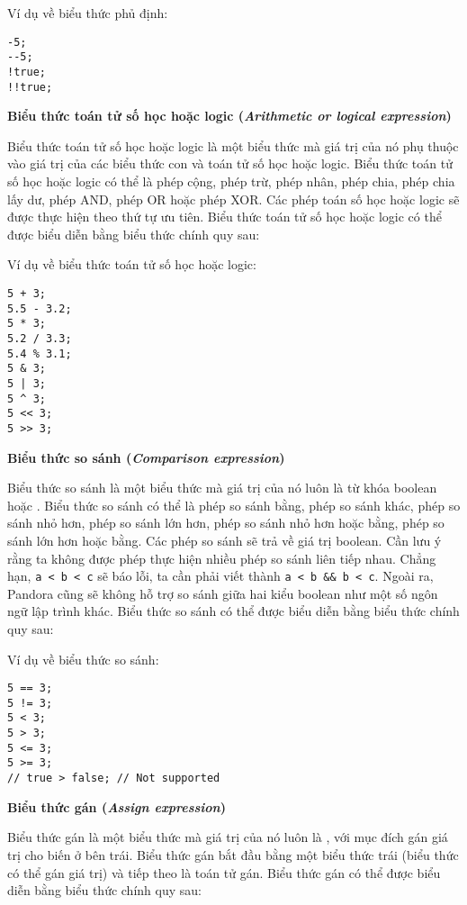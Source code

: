 \regexneexpr

\noindent Ví dụ về biểu thức phủ định:
\begin{lstlisting}[]
-5;
--5;
!true;
!!true;
\end{lstlisting}

\noindent\textbf{Biểu thức toán tử số học hoặc logic (\textit{Arithmetic or logical expression})}

    Biểu thức toán tử số học hoặc logic là một biểu thức mà giá trị của nó phụ thuộc vào giá trị của các biểu thức con và toán tử số học hoặc logic. Biểu thức toán tử số học hoặc logic có thể là phép cộng, phép trừ, phép nhân, phép chia, phép chia lấy dư, phép AND, phép OR hoặc phép XOR. Các phép toán số học hoặc logic sẽ được thực hiện theo thứ tự ưu tiên. Biểu thức toán tử số học hoặc logic có thể được biểu diễn bằng biểu thức chính quy sau:

\regexarithlogicexpr

\noindent Ví dụ về biểu thức toán tử số học hoặc logic:
\begin{lstlisting}[]
5 + 3;
5.5 - 3.2;
5 * 3;
5.2 / 3.3;
5.4 % 3.1;
5 & 3;
5 | 3;
5 ^ 3;
5 << 3;
5 >> 3;
\end{lstlisting}

\noindent\textbf{Biểu thức so sánh (\textit{Comparison expression})}

    Biểu thức so sánh là một biểu thức mà giá trị của nó luôn là từ khóa boolean  hoặc . Biểu thức so sánh có thể là phép so sánh bằng, phép so sánh khác, phép so sánh nhỏ hơn, phép so sánh lớn hơn, phép so sánh nhỏ hơn hoặc bằng, phép so sánh lớn hơn hoặc bằng. Các phép so sánh sẽ trả về giá trị boolean. Cần lưu ý rằng ta không được phép thực hiện nhiều phép so sánh liên tiếp nhau. Chẳng hạn, \texttt{a < b < c} sẽ báo lỗi, ta cần phải viết thành \texttt{a < b \&\& b < c}. Ngoài ra, Pandora cũng sẽ không hỗ trợ so sánh giữa hai kiểu boolean như một số ngôn ngữ lập trình khác. Biểu thức so sánh có thể được biểu diễn bằng biểu thức chính quy sau:

\regexcompexpr

\noindent Ví dụ về biểu thức so sánh:
\begin{lstlisting}[]
5 == 3;
5 != 3;
5 < 3;
5 > 3;
5 <= 3;
5 >= 3;
// true > false; // Not supported
\end{lstlisting}

\noindent\textbf{Biểu thức gán (\textit{Assign expression})}

    Biểu thức gán là một biểu thức mà giá trị của nó luôn là , với mục đích gán giá trị cho biến ở bên trái. Biểu thức gán bắt đầu bằng một biểu thức trái (biểu thức có thể gán giá trị) và tiếp theo là toán tử gán. Biểu thức gán có thể được biểu diễn bằng biểu thức chính quy sau:


